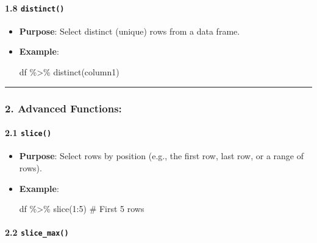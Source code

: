 \documentclass[
  letterpaper,
  DIV=11,
  numbers=noendperiod]{scrartcl}
\let\oldparagraph\paragraph
\renewcommand{\paragraph}[1]{\oldparagraph{#1}\mbox{}}
\newenvironment{Shaded}{\begin{snugshade}}{\end{snugshade}}
\newcommand{\CommentTok}[1]{\textcolor[rgb]{0.37,0.37,0.37}{#1}}
\newcommand{\DecValTok}[1]{\textcolor[rgb]{0.68,0.00,0.00}{#1}}
\newcommand{\FunctionTok}[1]{\textcolor[rgb]{0.28,0.35,0.67}{#1}}
\newcommand{\NormalTok}[1]{\textcolor[rgb]{0.00,0.23,0.31}{#1}}
\newcommand{\SpecialCharTok}[1]{\textcolor[rgb]{0.37,0.37,0.37}{#1}}
\begin{document}
\paragraph{\texorpdfstring{\textbf{1.8
\texttt{distinct()}}}{1.8 distinct()}}\label{distinct}

\begin{itemize}
\item
  \textbf{Purpose}: Select distinct (unique) rows from a data frame.
\item
  \textbf{Example}:

\begin{Shaded}
\begin{Highlighting}[]
\NormalTok{df }\SpecialCharTok{\%\textgreater{}\%} \FunctionTok{distinct}\NormalTok{(column1)}
\end{Highlighting}
\end{Shaded}
\end{itemize}

\begin{center}\rule{0.5\linewidth}{0.5pt}\end{center}

\subsubsection{\texorpdfstring{2. \textbf{Advanced
Functions:}}{2. Advanced Functions:}}\label{advanced-functions}

\paragraph{\texorpdfstring{\textbf{2.1
\texttt{slice()}}}{2.1 slice()}}\label{slice}

\begin{itemize}
\item
  \textbf{Purpose}: Select rows by position (e.g., the first row, last
  row, or a range of rows).
\item
  \textbf{Example}:

\begin{Shaded}
\begin{Highlighting}[]
\NormalTok{df }\SpecialCharTok{\%\textgreater{}\%} \FunctionTok{slice}\NormalTok{(}\DecValTok{1}\SpecialCharTok{:}\DecValTok{5}\NormalTok{)  }\CommentTok{\# First 5 rows}
\end{Highlighting}
\end{Shaded}
\end{itemize}

\paragraph{\texorpdfstring{\textbf{2.2
\texttt{slice\_max()}}}{2.2 slice\_max()}}\label{slice_max}
\end{document}
